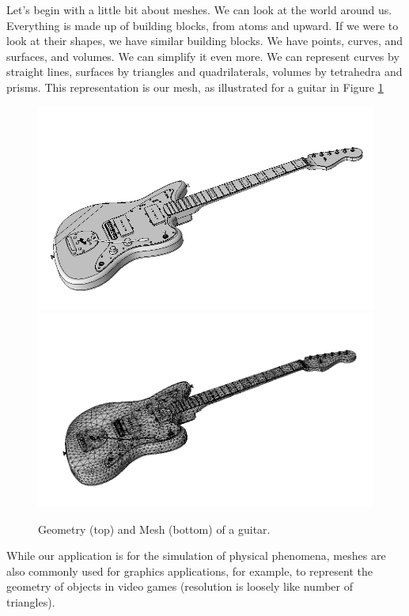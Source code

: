 \documentclass[12pt]{article}
\begin{document}
\maketitle

Let's begin with a little bit about meshes. We can look at the world around us. Everything is made up of building blocks, from atoms and upward. If we were to look at their shapes, we have similar building blocks. We have points, curves, and surfaces, and volumes. We can simplify it even more. We can represent curves by straight lines, surfaces by triangles and quadrilaterals, volumes by tetrahedra and prisms. This representation is our mesh, as illustrated for a guitar in Figure \ref{fig:guitar}
\begin{figure}
\includegraphics[width=1.0\textwidth]{images/guitarCAD.png}\\\includegraphics[width=1.0\textwidth]{images/guitarMESH.png}
\caption{Geometry (top) and Mesh (bottom) of a guitar.}
\label{fig:guitar}
\end{figure}
While our application is for the simulation of physical phenomena, meshes are also commonly used for graphics applications, for example, to represent the geometry of objects in video games (resolution is loosely like number of triangles).
\end{document}
